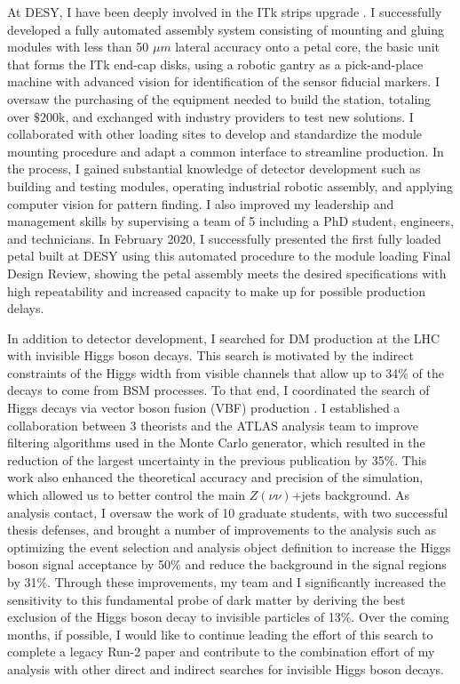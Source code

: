 \documentclass[a4paper]{article}
\begin{document}
At DESY, I have been deeply involved in the ITk strips upgrade \cite{ITKstrips}. I successfully developed a fully automated assembly system consisting of mounting and gluing modules with less than 50 $\mu m$ lateral accuracy onto a petal core, the basic unit that forms the ITk end-cap disks, using a robotic gantry as a pick-and-place machine with advanced vision for identification of the sensor fiducial markers. I oversaw the purchasing of the equipment needed to build the station, totaling over $\$200$k, and exchanged with industry providers to test new solutions. I collaborated with other loading sites to develop and standardize the module mounting procedure and adapt a common interface to streamline production. In the process, I gained substantial knowledge of detector development such as building and testing modules, operating industrial robotic assembly, and applying computer vision for pattern finding. I also improved my leadership and management skills by supervising a team of 5 including a PhD student, engineers, and technicians. In February 2020, I successfully presented the first fully loaded petal built at DESY using this automated procedure to the module loading Final Design Review, showing the petal assembly meets the desired specifications with high repeatability and increased capacity to make up for possible production delays.

\bigskip

In addition to detector development, I searched for DM production at the LHC with invisible Higgs boson decays. This search is motivated by the indirect constraints of the Higgs width from visible channels that allow up to 34\% of the decays to come from BSM processes. To that end, I coordinated the search of Higgs decays via vector boson fusion (VBF) production \cite{vbfMET_CONF2020}. I established a collaboration between 3 theorists and the ATLAS analysis team to improve filtering algorithms used in the Monte Carlo generator, which resulted in the reduction of the largest uncertainty in the previous publication by 35\%. This work also enhanced the theoretical accuracy and precision of the simulation, which allowed us to better control the main $Z\left(\nu\nu\right)$+jets background. As analysis contact, I oversaw the work of 10 graduate students, with two successful thesis defenses, and brought a number of improvements to the analysis such as optimizing the event selection and analysis object definition to increase the Higgs boson signal acceptance by 50\% and reduce the background in the signal regions by 31\%. Through these improvements, my team and I significantly increased the sensitivity to this fundamental probe of dark matter by deriving the best exclusion of the Higgs boson decay to invisible particles of 13\%. Over the coming months, if possible, I would like to continue leading the effort of this search to complete a legacy Run-2 paper and contribute to the combination effort of my analysis with other direct and indirect searches for invisible Higgs boson decays.
\end{document}
